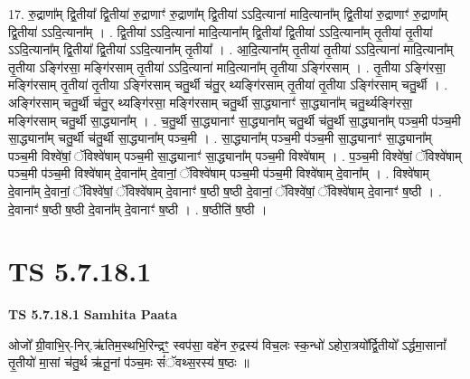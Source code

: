 \documentclass[17pt]{extarticle}
\begin{document}
17. रु॒द्राणा᳚म् द्वि॒तीया᳚ द्वि॒तीया॑ रु॒द्राणाꣳ॑ रु॒द्राणा᳚म् द्वि॒तीया॑ ऽऽदि॒त्याना॑ मादि॒त्याना᳚म् द्वि॒तीया॑ रु॒द्राणाꣳ॑ रु॒द्राणा᳚म् द्वि॒तीया॑ ऽऽदि॒त्याना᳚म् । . द्वि॒तीया॑ ऽऽदि॒त्याना॑ मादि॒त्याना᳚म् द्वि॒तीया᳚ द्वि॒तीया॑ ऽऽदि॒त्याना᳚म् तृ॒तीया॑ तृ॒तीया॑ ऽऽदि॒त्याना᳚म् द्वि॒तीया᳚ द्वि॒तीया॑ ऽऽदि॒त्याना᳚म् तृ॒तीया᳚ । . आ॒दि॒त्याना᳚म् तृ॒तीया॑ तृ॒तीया॑ ऽऽदि॒त्याना॑ मादि॒त्याना᳚म् तृ॒तीया ऽङ्गि॑रसा॒ मङ्गि॑रसाम् तृ॒तीया॑ ऽऽदि॒त्याना॑ मादि॒त्याना᳚म् तृ॒तीया ऽङ्गि॑रसाम् । . तृ॒तीया ऽङ्गि॑रसा॒ मङ्गि॑रसाम् तृ॒तीया॑ तृ॒तीया ऽङ्गि॑रसाम् चतु॒र्थी च॑तु॒र् थ्यङ्गि॑रसाम्  तृ॒तीया॑ तृ॒तीया ऽङ्गि॑रसाम् चतु॒र्थी । . अङ्गि॑रसाम् चतु॒र्थी च॑तु॒र् थ्यङ्गि॑रसा॒ मङ्गि॑रसाम् चतु॒र्थी सा॒द्ध्यानाꣳ॑ सा॒द्ध्याना᳚म् चतु॒र्थ्यङ्गि॑रसा॒ मङ्गि॑रसाम् चतु॒र्थी सा॒द्ध्याना᳚म् । . च॒तु॒र्थी सा॒द्ध्यानाꣳ॑ सा॒द्ध्याना᳚म् चतु॒र्थी च॑तु॒र्थी सा॒द्ध्याना᳚म् पञ्च॒मी प॑ञ्च॒मी सा॒द्ध्याना᳚म् चतु॒र्थी च॑तु॒र्थी सा॒द्ध्याना᳚म् पञ्च॒मी । . सा॒द्ध्याना᳚म् पञ्च॒मी प॑ञ्च॒मी सा॒द्ध्यानाꣳ॑ सा॒द्ध्याना᳚म् पञ्च॒मी विश्वे॑षां॒ ॅविश्वे॑षाम् पञ्च॒मी सा॒द्ध्यानाꣳ॑ सा॒द्ध्याना᳚म् पञ्च॒मी विश्वे॑षाम् । . प॒ञ्च॒मी विश्वे॑षां॒ ॅविश्वे॑षाम् पञ्च॒मी प॑ञ्च॒मी विश्वे॑षाम् दे॒वाना᳚म् दे॒वानां॒ ॅविश्वे॑षाम् पञ्च॒मी प॑ञ्च॒मी विश्वे॑षाम् दे॒वाना᳚म् । . विश्वे॑षाम् दे॒वाना᳚म् दे॒वानां॒ ॅविश्वे॑षां॒ ॅविश्वे॑षाम् दे॒वानाꣳ॑ ष॒ष्ठी ष॒ष्ठी दे॒वानां॒ ॅविश्वे॑षां॒ ॅविश्वे॑षाम् दे॒वानाꣳ॑ ष॒ष्ठी । . दे॒वानाꣳ॑ ष॒ष्ठी ष॒ष्ठी दे॒वाना᳚म् दे॒वानाꣳ॑ ष॒ष्ठी । . ष॒ष्ठीति॑ ष॒ष्ठी । \newline
\pagebreak
{}

\section{ TS 5.7.18.1 }

\textbf{TS 5.7.18.1 } \newline
\textbf{Samhita Paata} \newline

ओजो᳚ ग्री॒वाभि॒र्-निर्.ऋ॑तिम॒स्थभि॒रिन्द्रꣳ॒॒ स्वप॑सा॒ वहे॑न रु॒द्रस्य॑ विच॒लः स्क॒न्धो॑ ऽहोरा॒त्रयो᳚र्द्वि॒तीयो᳚ ऽर्द्धमा॒सानां᳚ तृ॒तीयो॑ मा॒सां च॑तु॒र्थ ऋ॑तू॒नां प॑ञ्च॒मः सं॑ॅवथ्स॒रस्य॑ ष॒ष्ठः ॥ \newline
\end{document}
